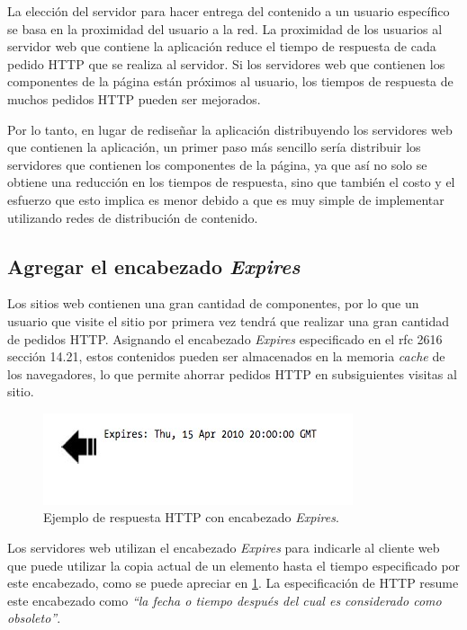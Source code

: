 La elección del servidor para hacer entrega del contenido a un usuario específico se basa en la proximidad del usuario a la red. La proximidad de los usuarios al servidor web que contiene la aplicación reduce el tiempo de respuesta de cada pedido HTTP que se realiza al servidor. Si los servidores web que contienen los componentes de la página están próximos al usuario, los tiempos de respuesta de muchos pedidos HTTP pueden ser mejorados.

Por lo tanto, en lugar de rediseñar la aplicación distribuyendo los servidores web que contienen la aplicación, un primer paso más sencillo sería distribuir los servidores
que contienen los componentes de la página, ya que así no solo se obtiene una reducción en los tiempos de respuesta, sino que también el costo y el esfuerzo que esto implica es menor debido a que es muy simple de implementar utilizando redes de distribución de contenido.

\subsection{Agregar el encabezado \emph{Expires}}
\label{cap3:reglas:expires}

Los sitios web contienen una gran cantidad de componentes, por lo que un usuario que visite el sitio por primera vez tendrá que realizar una gran cantidad de pedidos HTTP.
Asignando el encabezado \emph{Expires} especificado en el rfc 2616 \cite{rfc2616} sección 14.21, estos contenidos pueden ser almacenados en la memoria \emph{cache}
de los navegadores, lo que permite ahorrar pedidos HTTP en subsiguientes visitas al sitio.

\begin{figure}[h!]
\centering
\includegraphics[scale=0.5]{figuras/hpws/expires.jpg}
  \caption{Ejemplo de respuesta HTTP con encabezado \emph{Expires}.}
    \label{fig.expires}
\end{figure}

Los servidores web utilizan el encabezado \emph{Expires} para indicarle al cliente web que puede utilizar la copia actual de un elemento hasta el tiempo especificado por este encabezado, como se puede apreciar en \ref{fig.expires}.
La especificación de HTTP resume este encabezado como \emph{``la fecha o tiempo después del cual es considerado como obsoleto''}.

